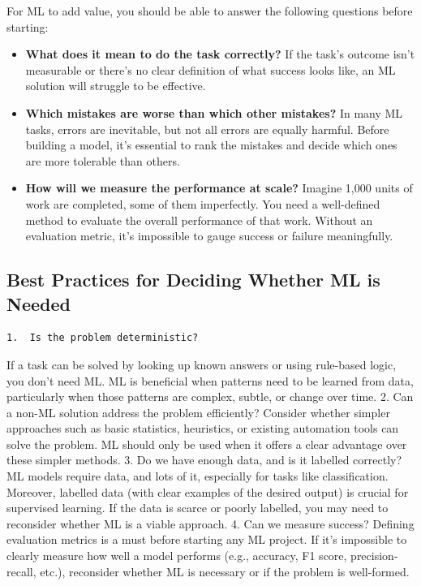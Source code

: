 \documentclass[
  letterpaper,
  DIV=11,
  numbers=noendperiod]{scrreprt}
\providecommand{\tightlist}{%
  \setlength{\itemsep}{0pt}\setlength{\parskip}{0pt}}\usepackage{longtable,booktabs,array}
\begin{document}
For ML to add value, you should be able to answer the following
questions before starting:

\begin{itemize}
\tightlist
\item
  \textbf{What does it mean to do the task correctly?} If the task's
  outcome isn't measurable or there's no clear definition of what
  success looks like, an ML solution will struggle to be effective.
\item
  \textbf{Which mistakes are worse than which other mistakes?} In many
  ML tasks, errors are inevitable, but not all errors are equally
  harmful. Before building a model, it's essential to rank the mistakes
  and decide which ones are more tolerable than others.
\item
  \textbf{How will we measure the performance at scale?} Imagine 1,000
  units of work are completed, some of them imperfectly. You need a
  well-defined method to evaluate the overall performance of that work.
  Without an evaluation metric, it's impossible to gauge success or
  failure meaningfully.
\end{itemize}

\subsection{Best Practices for Deciding Whether ML is
Needed}\label{best-practices-for-deciding-whether-ml-is-needed}

\begin{verbatim}
1.  Is the problem deterministic?
\end{verbatim}

If a task can be solved by looking up known answers or using rule-based
logic, you don't need ML. ML is beneficial when patterns need to be
learned from data, particularly when those patterns are complex, subtle,
or change over time. 2. Can a non-ML solution address the problem
efficiently? Consider whether simpler approaches such as basic
statistics, heuristics, or existing automation tools can solve the
problem. ML should only be used when it offers a clear advantage over
these simpler methods. 3. Do we have enough data, and is it labelled
correctly? ML models require data, and lots of it, especially for tasks
like classification. Moreover, labelled data (with clear examples of the
desired output) is crucial for supervised learning. If the data is
scarce or poorly labelled, you may need to reconsider whether ML is a
viable approach. 4. Can we measure success? Defining evaluation metrics
is a must before starting any ML project. If it's impossible to clearly
measure how well a model performs (e.g., accuracy, F1 score,
precision-recall, etc.), reconsider whether ML is necessary or if the
problem is well-formed.
\end{document}
